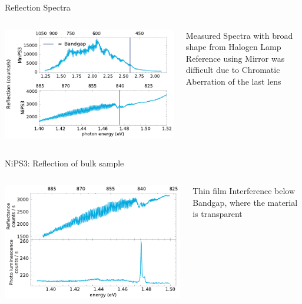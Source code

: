 \documentclass[
	10pt,
]{beamer}
\begin{document}
\begin{frame}{Reflection Spectra}

	\begin{columns}
		\centering
		\includegraphics[width=\textwidth]{../figures/2024-03-14 reflection spectra.pdf}

		Measured Spectra with broad shape from Halogen Lamp
		\vspace{.5cm}\\
		Reference using Mirror was difficult due to Chromatic Aberration of the last lens
	\end{columns}
\end{frame}

\begin{frame}{NiPS3: Reflection of bulk sample}
	\begin{columns}
		\column{.7\textwidth}
		\centering
		\includegraphics[width=\textwidth]{../figures/2024-02-06 NiPS3 PL and reflectance.pdf}

		\column{.3\textwidth}
		Thin film Interference below Bandgap, where the material is transparent
	\end{columns}
\end{frame}
\end{document}
